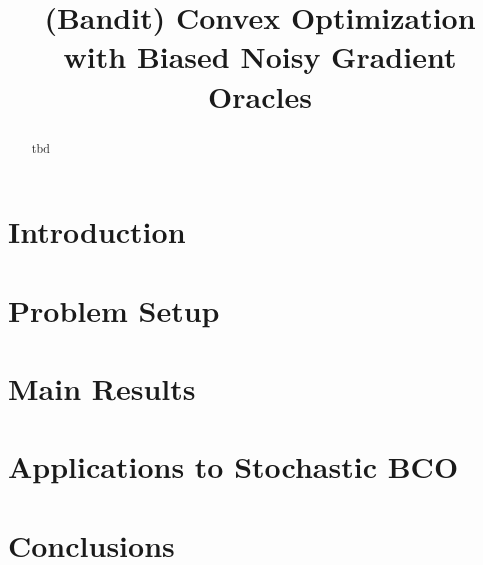 \documentclass{article} %
\title{(Bandit) Convex Optimization with Biased Noisy Gradient Oracles}
\author{
}%
\begin{document}
\maketitle


\begin{abstract} 
tbd
\end{abstract} 


\section{Introduction}
\label{sec:intro}


\section{Problem Setup}
\label{sec:problem}


\section{Main Results}
\label{sec:results}


\section{Applications to Stochastic BCO}
\label{sec:sbco}


\section{Conclusions}
\label{sec:conc}







\end{document}

